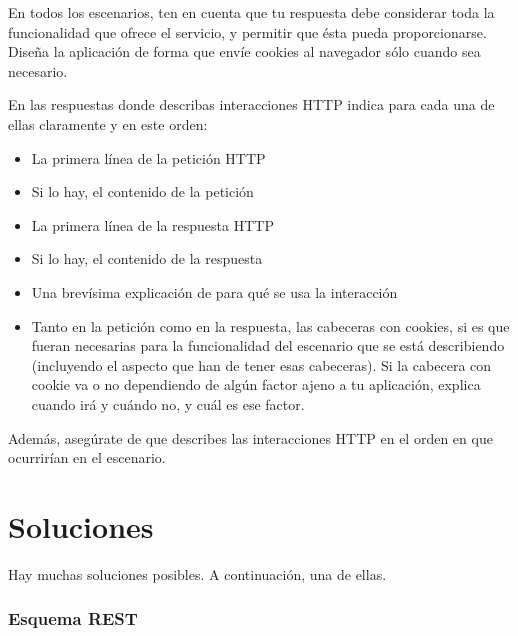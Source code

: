 En todos los escenarios, ten en cuenta que tu respuesta debe considerar toda la funcionalidad que ofrece el servicio, y permitir que ésta pueda proporcionarse. Diseña la aplicación de forma que envíe cookies al navegador sólo cuando sea necesario.

En las respuestas donde describas interacciones HTTP indica para cada una de ellas claramente y en este orden:
  \begin{itemize}
  \item La primera línea de la petición HTTP
  \item Si lo hay, el contenido de la petición
  \item La primera línea de la respuesta HTTP
  \item Si lo hay, el contenido de la respuesta
  \item Una brevísima explicación de para qué se usa la interacción
  \item Tanto en la petición como en la respuesta, las cabeceras con cookies, si es que fueran necesarias para la funcionalidad del escenario que se está describiendo (incluyendo el aspecto que han de tener esas cabeceras). Si la cabecera con cookie va o no dependiendo de algún factor ajeno a tu aplicación, explica cuando irá y cuándo no, y cuál es ese factor.
  \end{itemize}

Además, asegúrate de que describes las interacciones HTTP en el orden en que ocurrirían en el escenario.

\section*{Soluciones}

Hay muchas soluciones posibles. A continuación, una de ellas.

\subsubsection*{Esquema REST}

